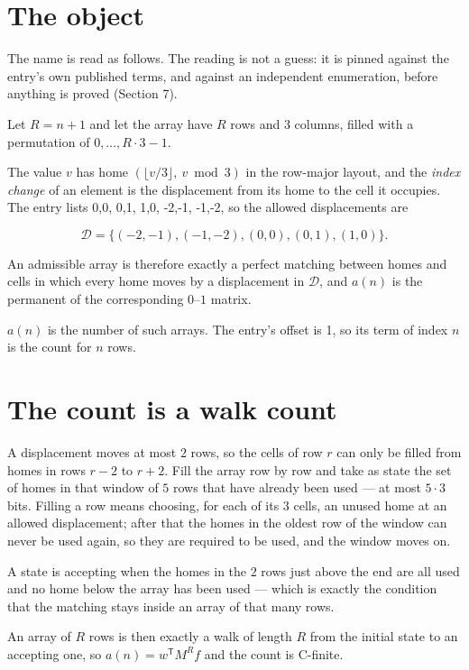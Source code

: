 \documentclass[11pt]{article}
\theoremstyle{definition}
\begin{document}
\section{The object}

The name is read as follows. The reading is not a guess: it is pinned against the entry's own published terms, and against an independent enumeration, before anything is proved (Section 7).

Let $R = n + 1$ and let the array have $R$ rows and $3$ columns, filled with a permutation of $0,\dots,R\cdot3-1$.

The value $v$ has home $(\lfloor v/3\rfloor,\ v \bmod 3)$ in the row-major layout, and the {\itshape index change} of an element is the displacement from its home to the cell it occupies. The entry lists 0,0, 0,1, 1,0, -2,-1, -1,-2, so the allowed displacements are

\[\mathcal{D} = \{(-2,-1), (-1,-2), (0,0), (0,1), (1,0)\}.\]

An admissible array is therefore exactly a perfect matching between homes and cells in which every home moves by a displacement in $\mathcal{D}$, and $a(n)$ is the permanent of the corresponding $0$--$1$ matrix.

$a(n)$ is the number of such arrays. The entry's offset is 1, so its term of index $n$ is the count for $n$ rows.

\section{The count is a walk count}

A displacement moves at most $2$ rows, so the cells of row $r$ can only be filled from homes in rows $r-2$ to $r+2$. Fill the array row by row and take as state the set of homes in that window of $5$ rows that have already been used --- at most $5\cdot3$ bits. Filling a row means choosing, for each of its $3$ cells, an unused home at an allowed displacement; after that the homes in the oldest row of the window can never be used again, so they are required to be used, and the window moves on.

A state is accepting when the homes in the $2$ rows just above the end are all used and no home below the array has been used --- which is exactly the condition that the matching stays inside an array of that many rows.

An array of $R$ rows is then exactly a walk of length $R$ from the initial state to an accepting one, so $a(n) = w^{\mathsf T}M^{R}f$ and the count is C-finite.
\end{document}
